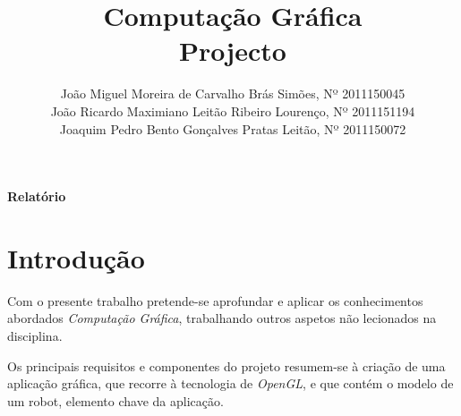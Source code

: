 \documentclass[11pt,a4paper]{article}
\title{\bf{Computação Gráfica}\vspace{50mm}\\Projecto\vspace{80mm}}
\author{
João Miguel Moreira de Carvalho Brás Simões, Nº 2011150045\\
João Ricardo Maximiano Leitão Ribeiro Lourenço, Nº 2011151194\\
Joaquim Pedro Bento Gonçalves Pratas Leitão, Nº 2011150072}
\begin{document}
\maketitle
\centerline{\textbf{Relatório}}
\pagebreak

\printindex

\pagebreak

\section{Introdução}

Com o presente trabalho pretende-se aprofundar e aplicar os conhecimentos abordados \emph{Computação Gráfica}, trabalhando outros aspetos não lecionados na disciplina.

Os principais requisitos e componentes do projeto resumem-se à criação de uma aplicação gráfica, que recorre à tecnologia de \emph{OpenGL}, e que contém o modelo de um robot, elemento chave da aplicação.
\end{document}

